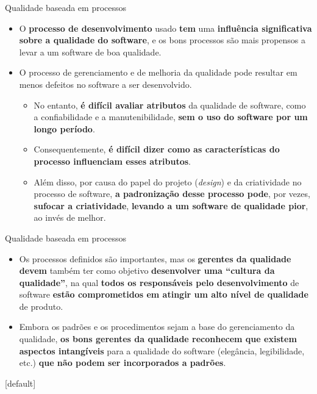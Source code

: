 \documentclass{beamer}
\begin{document}
\begin{frame}{Qualidade baseada em processos}
	\begin{itemize}
		\justifying
		\item<1,2> O \textbf{processo de desenvolvimento} usado \textbf{tem} uma \textbf{influência significativa sobre a qualidade do software}, e os bons processos são mais propensos a levar a um software de boa qualidade.
		\item<2-> O processo de gerenciamento e de melhoria da qualidade pode resultar em menos defeitos no software a ser desenvolvido.
		\begin{itemize}
			\justifying
			\item<2-3> No entanto, \textbf{é difícil avaliar atributos} da qualidade de software, como a confiabilidade e a manutenibilidade, \textbf{sem o uso do software por um longo período}. 
			\item<3> Consequentemente, \textbf{é difícil dizer como as características do processo influenciam esses atributos}.
			\item<4> Além disso, por causa do papel do projeto (\textit{design}) e da criatividade no processo de software, \textbf{a padronização desse processo pode}, por vezes, \textbf{sufocar a criatividade}, \textbf{levando a um software de qualidade pior}, ao invés de melhor.
		\end{itemize}
	\end{itemize}
\end{frame}

\begin{frame}{Qualidade baseada em processos}
	\begin{itemize}
		\justifying
		\item<1> Os processos definidos são importantes, mas os \textbf{gerentes da qualidade devem} também ter como objetivo \textbf{desenvolver uma ``cultura da qualidade''}, na qual \textbf{todos os responsáveis pelo desenvolvimento} de software \textbf{estão comprometidos em atingir um alto nível de qualidade} de produto.
		\item<2> Embora os padrões e os procedimentos sejam a base do gerenciamento da qualidade, \textbf{os bons gerentes da qualidade reconhecem que existem aspectos intangíveis} para a qualidade do software (elegância, legibilidade, etc.) \textbf{que não podem ser incorporados a padrões}.
	\end{itemize}
\end{frame}

[default]
\end{document}

